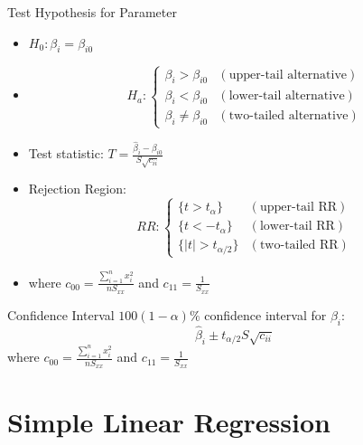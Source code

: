 \documentclass[12pt, a4paper, twoside, openright, titlepage]{book}
\begin{document}
\begin{rmk}{Test Hypothesis for Parameter}{}
    \leavevmode
    \begin{itemize}
        \item $H_0:\beta_i = \beta_{i0}$
        \item \begin{equation*}
                H_a:\left\{\begin{array}{cc} \beta_i > \beta_{i0}& (\text{upper-tail alternative}) \\ \beta_i < \beta_{i0} & (\text{lower-tail alternative}) \\ \beta_i \neq \beta_{i0} & (\text{two-tailed alternative}) \end{array}\right.
        \end{equation*}
    \item Test statistic: $T = \frac{\hat{\beta}_i - \beta_{i0}}{S\sqrt{c_{ii}}}$
        \item Rejection Region: \begin{equation*}
                RR: \left\{\begin{array}{cc} \{t > t_{\alpha}\} & (\text{upper-tail RR}) \\ \{t < -t_{\alpha}\} & (\text{lower-tail RR}) \\ \{|t| > t_{\alpha/2}\} & (\text{two-tailed RR}) \end{array}\right.
        \end{equation*}
        \item where $c_{00} = \frac{\sum_{i=1}^nx_i^2}{nS_{xx}}$ and $c_{11} = \frac{1}{S_{xx}}$
    \end{itemize}
\end{rmk}

\begin{rmk}{Confidence Interval}{}
    $100(1-\alpha)\%$ confidence interval for $\beta_i$: \begin{equation*}
        \hat{\beta}_i \pm t_{\alpha/2}S\sqrt{c_{ii}}
    \end{equation*}
    where $c_{00} = \frac{\sum_{i=1}^nx_i^2}{nS_{xx}}$ and $c_{11} = \frac{1}{S_{xx}}$
\end{rmk}

\section{\textsection Simple Linear Regression}
\end{document}
